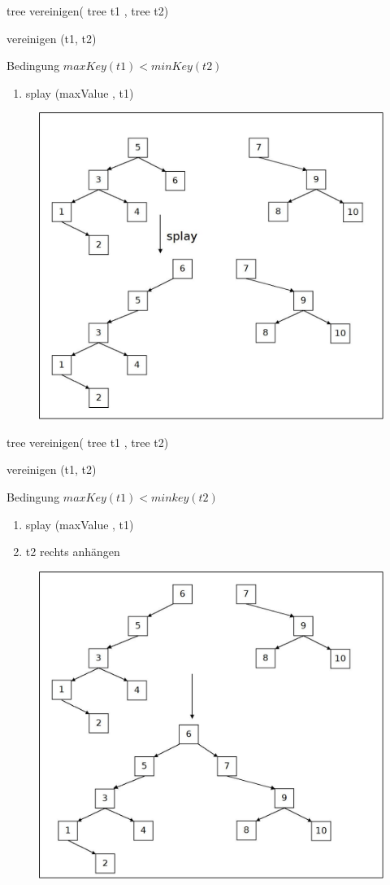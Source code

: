 \documentclass[11pt]{beamer}
\begin{document}
	\begin{frame}{tree vereinigen( tree t1 , tree t2)}
		\begin{block}{vereinigen (t1, t2)}
			\begin{block}{Bedingung}
				$maxKey(t1) < minKey(t2)$
				
			\end{block}
			\begin{enumerate}
				\item splay (maxValue ,  t1)
			\end{enumerate}
		\end{block}
		\pause	
		\begin{figure}[h]
			\centering
			\includegraphics[height=0.40\textwidth]{"bilder/vereinigen"}	
		\end{figure}
		
	\end{frame}	

		\begin{frame}{tree vereinigen( tree t1 , tree t2)}
		\begin{block}{vereinigen (t1, t2)}
			\begin{block}{Bedingung}
				$maxKey(t1) < minkey(t2)$
				
			\end{block}
			\begin{enumerate}
				\item splay (maxValue ,  t1)
				\item t2 rechts anhängen	
			\end{enumerate}
		\end{block}	
		\begin{figure}[h]
			\centering
			\includegraphics[height=0.40\textwidth]{"bilder/vereinigen1"}	
		\end{figure}
		
	\end{frame}	
\end{document}
